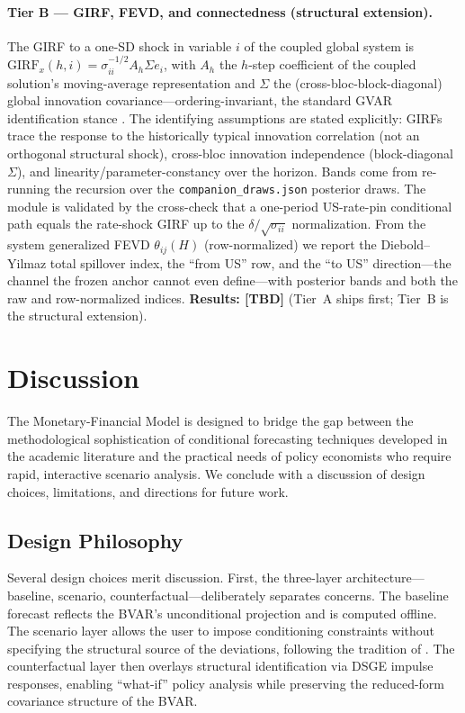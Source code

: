 \documentclass[11pt]{article}
\theoremstyle{definition}
\theoremstyle{remark}
\begin{document}
\paragraph{Tier B --- GIRF, FEVD, and connectedness (structural
extension).} The GIRF to a one-SD shock in variable $i$ of the coupled
global system is
\(\mathrm{GIRF}_x(h,i)=\sigma_{ii}^{-1/2}A_h\Sigma e_i\), with $A_h$ the
$h$-step coefficient of the coupled solution's moving-average
representation and $\Sigma$ the (cross-bloc-block-diagonal) global
innovation covariance---ordering-invariant, the standard GVAR
identification stance \citep{PesaranShin1998,DeesDiMauroPesaranSmith2007}.
The identifying assumptions are stated explicitly: GIRFs trace the
response to the historically typical innovation correlation (not an
orthogonal structural shock), cross-bloc innovation independence
(block-diagonal $\Sigma$), and linearity/parameter-constancy over the
horizon. Bands come from re-running the recursion over the
\texttt{companion\_draws.json} posterior draws. The module is validated by
the cross-check that a one-period US-rate-pin conditional path equals the
rate-shock GIRF up to the $\delta/\sqrt{\sigma_{ii}}$ normalization.
From the system generalized FEVD $\theta_{ij}(H)$ (row-normalized) we
report the Diebold--Yilmaz total spillover index, the ``from US'' row, and
the ``to US'' direction---the channel the frozen anchor cannot even
define---with posterior bands and both the raw and row-normalized indices.
\textbf{Results: [TBD]} (Tier~A ships first; Tier~B is the structural
extension).

\section{Discussion}\label{sec:discussion}

The Monetary-Financial Model is designed to bridge the gap between the
methodological sophistication of conditional forecasting techniques
developed in the academic literature and the practical needs of policy
economists who require rapid, interactive scenario analysis.  We
conclude with a discussion of design choices, limitations, and
directions for future work.

\subsection{Design Philosophy}

Several design choices merit discussion.  First, the three-layer
architecture---baseline, scenario, counterfactual---deliberately
separates concerns.  The baseline forecast reflects the BVAR's
unconditional projection and is computed offline.  The scenario layer
allows the user to impose conditioning constraints without specifying
the structural source of the deviations, following the tradition of
\citet{WaggonerZha1999}.  The counterfactual layer then overlays
structural identification via DSGE impulse responses, enabling
``what-if'' policy analysis while preserving the reduced-form
covariance structure of the BVAR.
\end{document}
